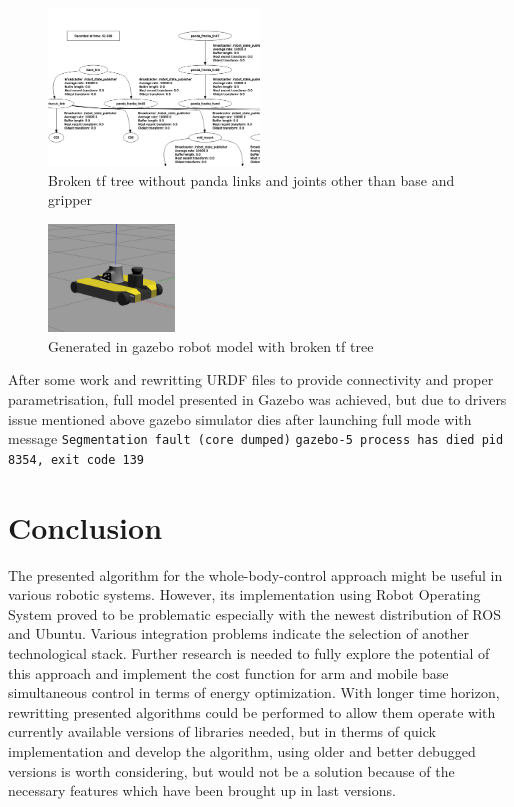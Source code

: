 \documentclass[conference,a4paper]{IEEEtran}
\begin{document}
\begin{figure}[ht]
  \centering
  \includegraphics[width=0.5\textwidth]{img/image_Cropped.png}
  \caption[broken tf tree]{Broken tf tree without panda links and joints other than base and gripper}
\end{figure}
\FloatBarrier

\begin{figure}[ht]
  \centering
  \includegraphics[width=0.3\textwidth]{img/robot.png}
  \caption[robot in gazebo]{Generated in gazebo robot model with broken tf tree}
\end{figure}
\FloatBarrier

After some work and rewritting URDF files to provide connectivity and proper parametrisation, full model presented in Gazebo was achieved, but due to drivers issue mentioned above
gazebo simulator dies after launching full mode with message \break \texttt{Segmentation fault (core dumped)} \break
\texttt{gazebo-5 process has died pid 8354, exit code 139}

\section{Conclusion}
The presented algorithm for the whole-body-control approach might be useful in various robotic systems. However, its implementation using Robot Operating System proved to be problematic especially with the newest distribution of ROS and Ubuntu. 
Various integration problems indicate the selection of another technological stack. Further research is needed to fully explore the potential of this approach and implement the cost function for arm and mobile base simultaneous control in terms of energy optimization.
With longer time horizon, rewritting presented algorithms could be performed to allow them operate with currently available versions of libraries needed, but in therms of quick implementation and develop the algorithm, using older and better debugged versions is worth considering, but would not be a solution because of the necessary features which have been brought up in last versions. 
\end{document}
